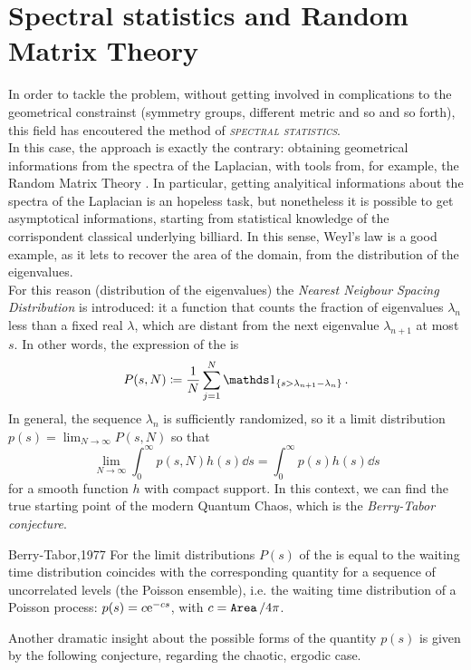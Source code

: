 \section{Spectral statistics and Random Matrix Theory}

In order to tackle the problem, without getting involved in complications to the geometrical constrainst (symmetry groups, different metric and so and so forth), this field has encoutered the method of \emph{\textsc{spectral statistics}}.\\
In this case, the approach is exactly the contrary: obtaining geometrical informations from the spectra of the Laplacian, with tools from, for example, the Random Matrix Theory \RMT. In particular, getting analyitical informations about the spectra of the Laplacian is an hopeless task, but nonetheless it is possible to get asymptotical informations, starting from statistical knowledge of the corrispondent classical underlying billiard. In this sense, Weyl's law is a good example, as it lets to recover the area of the domain, from the distribution of the eigenvalues.\\
For this reason (distribution of the eigenvalues) the \emph{Nearest Neigbour Spacing Distribution} is introduced: it a function that counts the fraction of eigenvalues $\lambda_{n}$ less than a fixed real $\lambda$, which are distant from the next eigenvalue $\lambda_{n+1}$ at most $s$. In other words, the expression of the \NNSD is 
\[
P(s,N)\coloneqq\frac{1}{N}\sum_{j=1}^{N}\one_{\{s>\lambda_{n+1}-\lambda_{n}\}}.
\]
In general, the sequence $\lambda_{n}$ is sufficiently randomized, so it  a limit distribution $p(s)=\lim_{N\to\infty}P(s,N)$ so that
\[
\lim_{N\to\infty}\int_{0}^{\infty}p(s,N)h(s)\dd s=\int_{0}^{\infty}p(s)h(s)\dd s
\]
for a smooth function $h$ with compact support. In this context, we can find the true starting point of the modern Quantum Chaos, which is the \emph{Berry-Tabor conjecture}.

\begin{impConj}{Berry-Tabor,1977}{}
For  the limit distributions $P(s)$ of the \NNSD  is equal to the waiting time distribution coincides with the corresponding quantity for
a sequence of uncorrelated levels (the Poisson ensemble), i.e. the waiting time distribution of a Poisson process: $p(s)=c\mathrm{e}^{-cs}$, with $c=\operatorname{\mathtt{Area}}/4\pi$.
\end{impConj}

Another dramatic insight about the possible forms of the quantity $p(s)$ is given by the following conjecture, regarding the chaotic, ergodic case.

